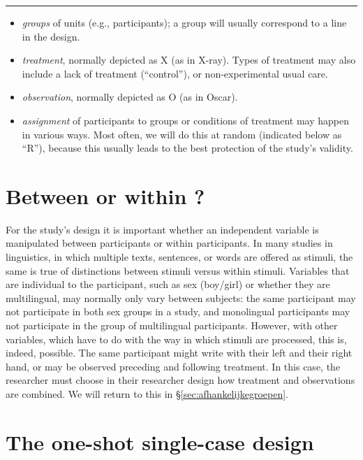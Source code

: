 \documentclass[
]{book}
\begin{document}
\begin{center}\rule{0.5\linewidth}{0.5pt}\end{center}

\begin{itemize}
\item
  \emph{groups} of units (e.g., participants); a group will usually correspond to a line in the design.
\item
  \emph{treatment}, normally depicted as X (as in X-ray). Types of treatment may also include a lack of treatment (``control''), or non-experimental usual care.
\item
  \emph{observation}, normally depicted as O (as in Oscar).
\item
  \emph{assignment} of participants to groups or conditions of treatment may happen in various ways. Most often, we will do this at random (indicated below as ``R''), because this usually leads to the best protection of the study's validity.
\end{itemize}

\hypertarget{sec:betweenwithinparticipants}{%
\section{Between or within ?}\label{sec:betweenwithinparticipants}}

For the study's design it is important whether an independent variable is manipulated between participants or within participants. In many studies in linguistics, in which multiple texts, sentences, or words are offered as stimuli, the same is true of distinctions between stimuli versus within stimuli. Variables that are individual to the participant, such as sex (boy/girl) or whether they are multilingual, may normally only vary between subjects: the same participant may not participate in both sex groups in a study, and monolingual participants may not participate in the group of multilingual participants. However, with other variables, which have to do with the way in which stimuli are processed, this is, indeed, possible. The same participant might write with their left and their right hand, or may be observed preceding and following treatment. In this case, the researcher must choose in their researcher design how treatment and observations are combined. We will return to this in §\ref{sec:afhankelijkegroepen}.

\hypertarget{sec:one-shot-single-case-design}{%
\section{The one-shot single-case design}\label{sec:one-shot-single-case-design}}
\end{document}
